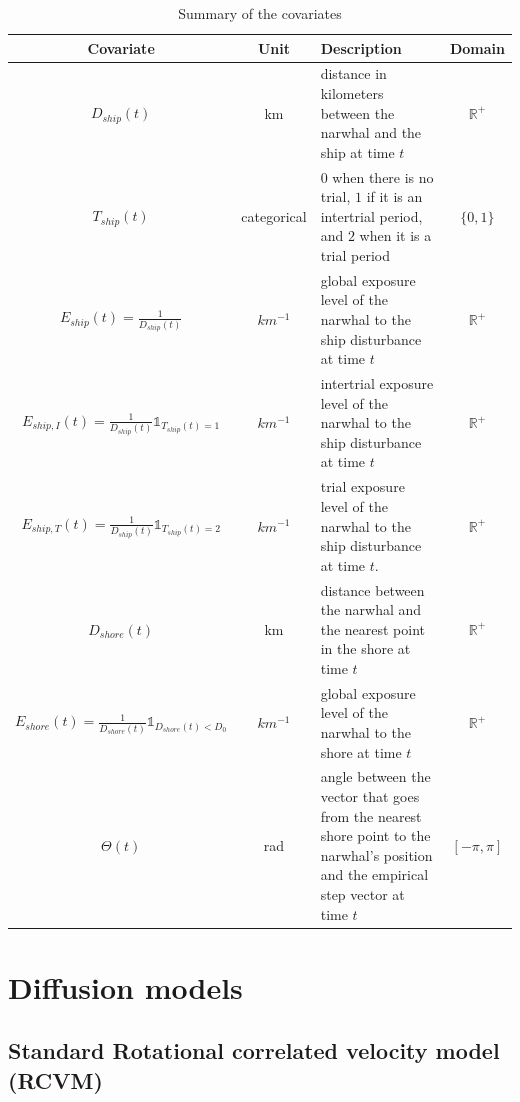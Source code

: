 \documentclass[11pt]{article}
\newcommand {\R}{\mathbb{R}}
\newcommand {\1}{\mathbb{1}}
\begin{document}
\begin{table}[H]
\centering
\begin{tabular}{|c|c|p{8cm}|c|}
\hline
Covariate & Unit & Description & Domain \\
\hline
$D_{ship}(t)$ & km & distance in kilometers between the narwhal and the ship at time $t$ & $\R^+$ \\
\hline
$T_{ship}(t)$  & categorical & $0$ when there is no trial, $1$ if it is an intertrial period, and $2$ when it is a trial period & $\{0,1\}$\\
\hline
$E_{ship}(t)=\frac{1}{D_{ship}(t)}$ & $km^{-1}$ & global exposure level of the narwhal to the ship disturbance at time $t$ & $\R^+$ \\
\hline
$E_{ship,I}(t)=\frac{1}{D_{ship}(t)}\mathbb{1}_{T_{ship}(t)=1}$& $km^{-1}$ & intertrial exposure level of the narwhal to the ship disturbance at time $t$ & $\R^+$ \\
\hline
 $E_{ship,T}(t)=\frac{1}{D_{ship}(t)}\mathbb{1}_{T_{ship}(t)=2}$ & $km^{-1}$ & trial exposure level of the narwhal to the ship disturbance at time $t$. & $\R^+$\\
 \hline
 $D_{shore}(t)$ & km & distance between the narwhal and the nearest point in the shore at time $t$ & $\R^+$ \\
 \hline
 $E_{shore}(t)=\frac{1}{D_{shore}(t)} \1_{D_{shore}(t)<D_0}$ & $km^{-1}$ & global exposure level of the narwhal to the shore at time $t$ & $\R^+$ \\
 \hline
 $\Theta(t)$ & rad & angle between the vector that goes from the nearest shore point to the narwhal's position and the empirical step vector at time $t$  & $[-\pi,\pi]$ \\
 \hline 
\end{tabular}
\caption{Summary of the covariates}
\label{tab: covariates}
\end{table}







\section{Diffusion models}

\subsection{Standard Rotational correlated velocity model (RCVM)}
\label{section: RCVM}
\end{document}
